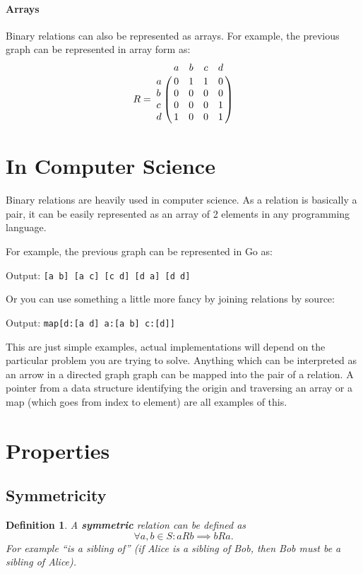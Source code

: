 \documentclass[11pt]{article}
\theoremstyle{plain}
\newtheorem{defn}{Definition}
\theoremstyle{definition}
\begin{document}
\paragraph{Arrays} Binary relations can also be represented as arrays.
For example,
the previous graph can be represented in array form as:
\begin{equation*}
  R = \bordermatrix{~ & a & b & c & d \cr
  a & 0 & 1 & 1 & 0 \cr
  b & 0 & 0 & 0 & 0 \cr
  c & 0 & 0 & 0 & 1 \cr
d & 1 & 0 & 0 & 1 \cr}
\end{equation*}

\section{In Computer Science}

Binary relations are heavily used in computer science.
As a relation is basically a pair,
it can be easily represented as an array of 2 elements in any programming language.

For example, the previous graph can be represented in Go as:



Output: \verb+[a b] [a c] [c d] [d a] [d d]+

Or you can use something a little more fancy by joining relations by source:



Output: \verb+map[d:[a d] a:[a b] c:[d]]+

This are just simple examples,
actual implementations will depend on the particular problem you are trying to solve.
Anything which can be interpreted as an arrow in a directed graph graph can be mapped into the pair of a relation.
A pointer from a data structure identifying the origin and  traversing an array or a map (which goes from index to element) are all examples of this.

\section{Properties}

\subsection{Symmetricity}

\begin{defn}
  A \textbf{symmetric} relation can be defined as
  \[ \forall a, b \in S: aRb \implies bRa .\]
  For example ``is a sibling of'' (if Alice is a sibling of Bob, then Bob must be a sibling of Alice).
\end{defn}
\end{document}
